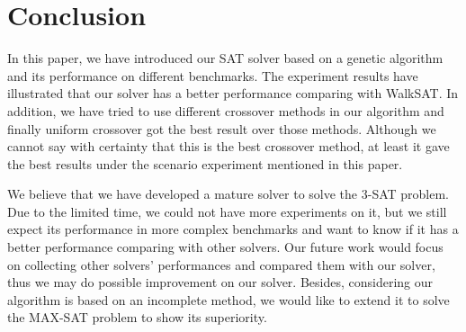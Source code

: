 \section{Conclusion}

In this paper, we have introduced our SAT solver based on a genetic algorithm and its performance on different benchmarks. The experiment results have illustrated that our solver has a better performance comparing with WalkSAT. In addition, we have tried to use different crossover methods in our algorithm and finally uniform crossover got the best result over those methods. Although we cannot say with certainty that this is the best crossover method, at least it gave the best results under the scenario experiment mentioned in this paper. 

We believe that we have developed a mature solver to solve the 3-SAT problem. Due to the limited time, we could not have more experiments on it, but we still expect its performance in more complex benchmarks and want to know if it has a better performance comparing with other solvers. Our future work would focus on collecting other solvers' performances and compared them with our solver, thus we may do possible improvement on our solver. Besides, considering our algorithm is based on an incomplete method, we would like to extend it to solve the MAX-SAT problem to show its superiority.